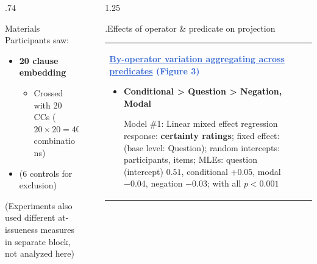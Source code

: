 \documentclass[final, table, cmyk]{beamer}
\newlength{\sepwidth}
\newlength{\colwidth}
\newlength{\mboxpreadjust}
\newcommand{\separatorcolumn}{\begin{column}{\sepwidth}\end{column}}
\begin{document}
\begin{frame}[t]
\begin{columns}[t]
\begin{column}{.74\colwidth}
\begin{normalbox}{Materials}
					\vspace{-.2\baselineskip}
					Participants saw:
					\vspace{-.3\baselineskip}
					\begin{itemize}
						\item \textbf{20 clause embedding }

						\begin{itemize}
							\item  Crossed with 20 CCs ($20 \times 20 = 400$ combinations)
						\end{itemize}

						\item (6 controls for exclusion)

					\end{itemize}
				\vspace{-.2\baselineskip}
				{\small (Experiments also used different at-issueness measures in separate block, not analyzed here)}

			\end{normalbox}
			
		\end{column}

		\separatorcolumn
		
		\begin{column}{1.25\colwidth}
			\begin{normalbox}{\phantom.\hfill Effects of operator \& predicate on projection}
				\hspace{-.2cm}\begin{tabular}{p{.70\linewidth} p{.3\linewidth}}
					\textcolor{highlight}{\large \Raleway \bfseries \underline{By-operator variation aggregating across predicates} (Figure 3)}
					\vspace{-.15\baselineskip}
					\begin{itemize} \small
						\item {\bf \textcolor{cond}{\bf Conditional} > \textcolor{question}{\bf Question} > \textcolor{neg}{\bf Negation}, \textcolor{modal}{\bf Modal}}
							\vspace{\mboxpreadjust}
							\begin{modelbox}{Model \#1: Linear mixed effect regression}
								\footnotesize
								response: \textbf{certainty ratings}; fixed effect: \ophighlight{operator} (base level: Question);
								random intercepts: participants, items; \newline
								MLEs: question (intercept) $0.51$, conditional $+0.05$, modal $-0.04$, negation $-0.03$; with all $p < 0.001$
							\end{modelbox}
							\vspace{\mboxpreadjust}


\end{itemize}
\end{tabular}
\end{normalbox}
\end{column}
\end{columns}
\end{frame}
\end{document}
